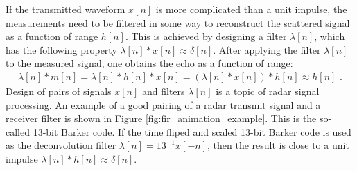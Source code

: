 If the transmitted waveform $x[n]$ is more complicated than a unit
impulse, the measurements need to be filtered in some way to
reconstruct the scattered signal as a function of range $h[n]$. This
is achieved by designing a filter $\lambda[n]$, which has the
following property $\lambda[n]*x[n] \approx \delta[n]$. After applying
the filter $\lambda[n]$ to the measured signal, one obtains the echo
as a function of range:
\begin{align}
\lambda[n]*m[n] = \lambda[n]*h[n]*x[n] = (\lambda[n]*x[n])*h[n]\approx h[n]\,\,. 
\end{align}
Design of pairs of signals $x[n]$ and filters $\lambda[n]$ is a topic
of radar signal processing. An example of a good pairing of a radar
transmit signal and a receiver filter is shown in Figure
\ref{fig:fir_animation_example}. This is the so-called 13-bit Barker
code. If the time fliped and scaled 13-bit Barker code is used as the
deconvolution filter $\lambda[n]=13^{-1}x[-n]$, then the result is close to a unit impulse $\lambda[n]*h[n] \approx \delta[n]$.
